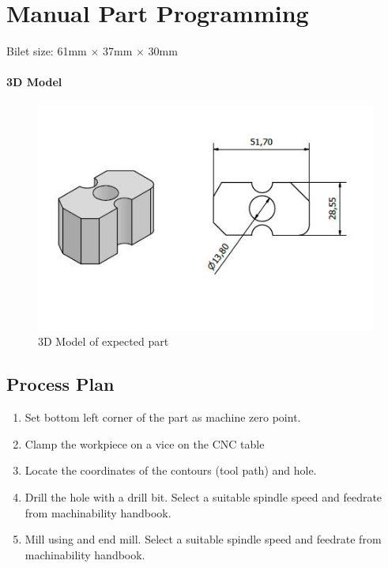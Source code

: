\section{Manual Part Programming}
Bilet size: 61mm $\times$ 37mm $\times$ 30mm
\paragraph{3D Model}
\begin{center}
	\begin{figure}[!h]
	\centering
	\includegraphics{Figures/3D}
	\caption[3D model]{3D Model of expected part}
	\end{figure}
\end{center}
\subsection{Process Plan}
\begin{enumerate}
\item Set bottom left corner of the part as machine zero point.
\item Clamp the workpiece on a vice on the CNC table
\item Locate the coordinates of the contours (tool path) and hole.
\item Drill the hole with a drill bit. Select a suitable spindle speed and feedrate from machinability handbook.
\item Mill using and end mill. Select a suitable spindle speed and feedrate from machinability handbook.
\end{enumerate}
